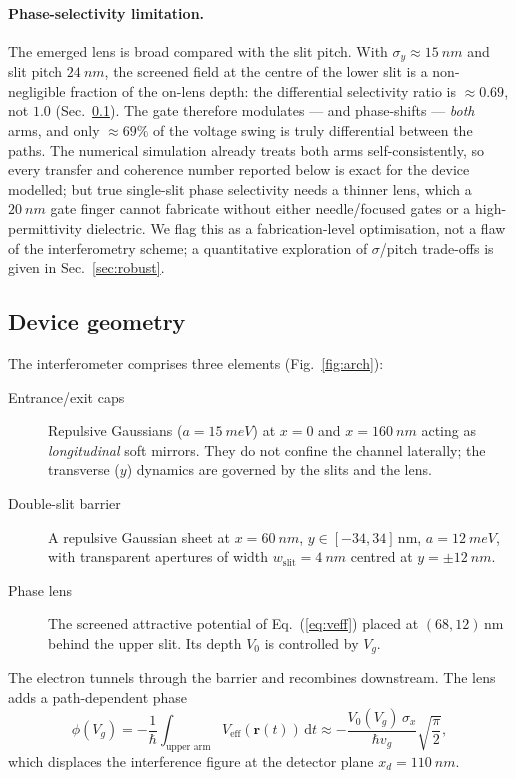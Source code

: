 \documentclass[11pt,a4paper]{article}
\newcommand{\dd}{\mathrm{d}}
\begin{document}
\paragraph{Phase-selectivity limitation.} The emerged lens is broad compared
with the slit pitch. With $\sigma_y\approx\SI{15}{nm}$ and slit pitch
$\SI{24}{nm}$, the screened field at the centre of the lower slit is a
non-negligible fraction of the on-lens depth: the differential selectivity
ratio is $\approx0.69$, not $1.0$ (Sec.~\ref{sec:geometry}). The gate
therefore modulates — and phase-shifts — \emph{both} arms, and only
$\approx69\%$ of the voltage swing is truly differential between the paths.
The numerical simulation already treats both arms self-consistently, so every
transfer and coherence number reported below is exact for the device
modelled; but true single-slit phase selectivity needs a thinner lens, which
a $\SI{20}{nm}$ gate finger cannot fabricate without either needle/focused
gates or a high-permittivity dielectric. We flag this as a fabrication-level
optimisation, not a flaw of the interferometry scheme; a quantitative
exploration of $\sigma$/pitch trade-offs is given in
Sec.~\ref{sec:robust}.

\subsection{Device geometry}
\label{sec:geometry}

The interferometer comprises three elements (Fig.~\ref{fig:arch}):
\begin{description}
\item[Entrance/exit caps] Repulsive Gaussians ($a=\SI{15}{meV}$) at $x=0$ and 
$x=\SI{160}{nm}$ acting as \emph{longitudinal} soft mirrors. They do not 
confine the channel laterally; the transverse ($y$) dynamics are governed by 
the slits and the lens.
\item[Double-slit barrier] A repulsive Gaussian sheet at $x=\SI{60}{nm}$, 
$y\in[-34,34]\,$nm, $a=\SI{12}{meV}$, with transparent apertures of width 
$w_{\text{slit}}=\SI{4}{nm}$ centred at $y=\pm\SI{12}{nm}$.
\item[Phase lens] The screened attractive potential of Eq.~(\ref{eq:veff}) 
placed at $(68,12)\,$nm behind the upper slit. Its depth $V_0$ is controlled 
by $V_g$.
\end{description}

The electron tunnels through the barrier and recombines downstream. The lens 
adds a path-dependent phase
\begin{equation}
\phi(V_g) = -\frac{1}{\hbar}\int_{\text{upper arm}} V_{\text{eff}}(\mathbf{r}(t))\,\dd t
\approx -\frac{V_0(V_g)\,\sigma_x}{\hbar v_g}\sqrt{\frac{\pi}{2}},
\label{eq:phase}
\end{equation}
which displaces the interference figure at the detector plane
$x_d=\SI{110}{nm}$.
\end{document}
